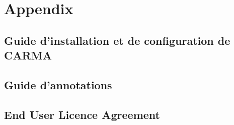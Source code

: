 \chapter{Appendix}
\section{Guide d'installation et de configuration de CARMA}
\label{ap:guideInstall}


\section{Guide d'annotations}
\label{ap:guidelines}


\section{End User Licence Agreement}
\label{ap:eula}


